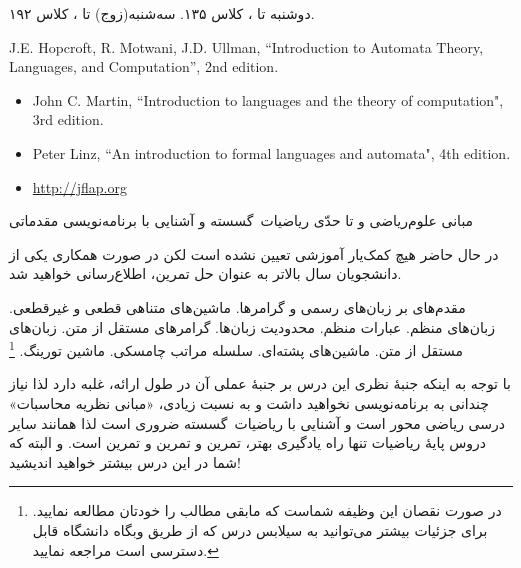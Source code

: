 \documentclass[10pt,a5paper,computeautoilg,pdfinfo=on]{unistyle}
\begin{document}

\ptext[1]

‌دوشنبه \clock[13:30] تا \clock[15:00]، کلاس ۱۳۵. سه‌شنبه(زوج) \clock[13:30] تا \clock[15]، کلاس ۱۹۲.

\begin{latin}
J.E. Hopcroft, R. Motwani, J.D. Ullman, ‍‍‍‍``\textsf{Introduction to Automata Theory, Languages, and Computation}'', 2nd edition‬‬.\footnotemark
\end{latin}


\begin{latin}
\begin{itemize}
	\item John C. Martin, ``\textsf{Introduction to languages and the theory of computation}", 3rd edition.
	\item Peter Linz, ``\textsf{An introduction to formal languages and automata}", 4th edition.
	\item \url{http://jflap.org}
\end{itemize}
\end{latin}

مبانی ‌علوم‌ریاضی و تا حدّی ریاضیات~گسسته و آشنایی با برنامه‌نویسی مقدماتی

در حال حاضر هیچ کمک‌یار آموزشی تعیین نشده است لکن در صورت همکاری یکی از دانشجویان سال بالاتر به عنوان حل تمرین،
اطلاع‌رسانی خواهید شد.

‫مقدم‌های بر زبان‌های رسمی و گرامرها. ماشین‌های متناهی قطعی و غیرقطعی. زبان‌های منظم. عبارات منظم. محدودیت زبان‌ها.
گرامرهای مستقل‬ ‫از متن. زبان‌های مستقل از متن. ماشین‌های پشته‌ای. سلسله مراتب چامسکی. ماشین تورینگ.‬%
\footnote{در صورت نقصان این وظیفه شماست که مابقی مطالب را خودتان مطالعه نمایید. برای جزئیات بیشتر می‌توانید به سیلابس درس که از طریق وبگاه دانشگاه قابل دسترسی است مراجعه نمایید.}


با توجه به اینکه جنبهٔ نظری این درس بر جنبهٔ عملی آن در طول ارائه، غلبه دارد لذا نیاز چندانی به برنامه‌نویسی نخواهید داشت و
 به نسبت زیادی، «مبانی نظریه محاسبات» درسی ریاضی محور است و آشنایی با ریاضیات~گسسته ضروری است
لذا همانند سایر دروس پایهٔ ریاضیات تنها راه یادگیری بهتر، تمرین و تمرین و تمرین است.
و البته که شما در این درس بیشتر خواهید اندیشید!
\end{document}
